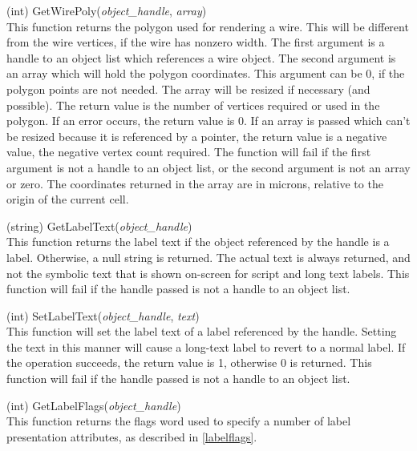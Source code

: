 \begin{description}
\item{(int) \vt GetWirePoly({\it object\_handle}, {\it array})}\\
This function returns the polygon used for rendering a wire.  This
will be different from the wire vertices, if the wire has nonzero
width.  The first argument is a handle to an object list which
references a wire object.  The second argument is an array which will
hold the polygon coordinates.  This argument can be 0, if the polygon
points are not needed.  The array will be resized if necessary (and
possible).  The return value is the number of vertices required or
used in the polygon.  If an error occurs, the return value is 0.  If
an array is passed which can't be resized because it is referenced by
a pointer, the return value is a negative value, the negative vertex
count required.  The function will fail if the first argument is not a
handle to an object list, or the second argument is not an array or
zero.  The coordinates returned in the array are in microns, relative
to the origin of the current cell.

\item{(string) \vt GetLabelText({\it object\_handle\/})}\\
This function returns the label text if the object referenced by the
handle is a label.  Otherwise, a null string is returned.  The actual
text is always returned, and not the symbolic text that is shown
on-screen for script and long text labels.  This function will fail if
the handle passed is not a handle to an object list.

\item{(int) \vt SetLabelText({\it object\_handle\/}, {\it text\/})}\\
This function will set the label text of a label referenced by the
handle.  Setting the text in this manner will cause a long-text label
to revert to a normal label.  If the operation succeeds, the return
value is 1, otherwise 0 is returned.  This function will fail if the
handle passed is not a handle to an object list.

\item{(int) \vt GetLabelFlags({\it object\_handle\/})}\\
This function returns the flags word used to specify a number of label
presentation attributes, as described in \ref{labelflags}.


\end{description}
